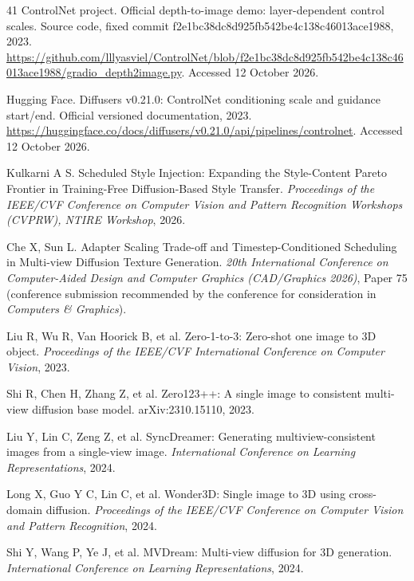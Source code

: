 \documentclass[times,twocolumn,final]{elsarticle}
\providecommand{\DIFaddbegin}{} %
\begin{document}
\DIFaddbegin
\begingroup
\color{blue}\sffamily
\linespread{0.94}\selectfont
\begin{thebibliography}{41}
ControlNet project. Official depth-to-image demo: layer-dependent control scales. Source code, fixed commit f2e1bc38dc8d925fb542be4c138c46013ace1988, 2023. \url{https://github.com/lllyasviel/ControlNet/blob/f2e1bc38dc8d925fb542be4c138c46013ace1988/gradio_depth2image.py}. Accessed 12 October 2026.

Hugging Face. Diffusers v0.21.0: ControlNet conditioning scale and guidance start/end. Official versioned documentation, 2023. \url{https://huggingface.co/docs/diffusers/v0.21.0/api/pipelines/controlnet}. Accessed 12 October 2026.

Kulkarni A S. Scheduled Style Injection: Expanding the Style-Content Pareto Frontier in Training-Free Diffusion-Based Style Transfer. \textit{Proceedings of the IEEE/CVF Conference on Computer Vision and Pattern Recognition Workshops (CVPRW), NTIRE Workshop}, 2026.

Che X, Sun L. Adapter Scaling Trade-off and Timestep-Conditioned Scheduling in Multi-view Diffusion Texture Generation. \textit{20th International Conference on Computer-Aided Design and Computer Graphics (CAD/Graphics 2026)}, Paper 75 (conference submission recommended by the conference for consideration in \textit{Computers \& Graphics}).

Liu R, Wu R, Van Hoorick B, et al. Zero-1-to-3: Zero-shot one image to 3D object. \textit{Proceedings of the IEEE/CVF International Conference on Computer Vision}, 2023.

Shi R, Chen H, Zhang Z, et al. Zero123++: A single image to consistent multi-view diffusion base model. arXiv:2310.15110, 2023.

Liu Y, Lin C, Zeng Z, et al. SyncDreamer: Generating multiview-consistent images from a single-view image. \textit{International Conference on Learning Representations}, 2024.

Long X, Guo Y C, Lin C, et al. Wonder3D: Single image to 3D using cross-domain diffusion. \textit{Proceedings of the IEEE/CVF Conference on Computer Vision and Pattern Recognition}, 2024.

Shi Y, Wang P, Ye J, et al. MVDream: Multi-view diffusion for 3D generation. \textit{International Conference on Learning Representations}, 2024.


\end{thebibliography}
\end{document}
